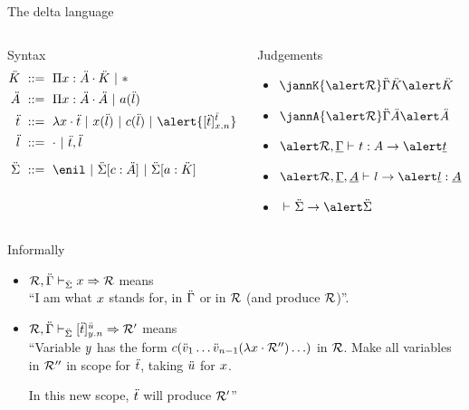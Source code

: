 \documentclass[ignorenonframetext,red]{beamer}
\begin{document}
\begin{frame}{The delta language}
  \inXLF
  \begin{columns}
    \begin{column}{0.6\textwidth}
      \begin{block}{Syntax} \vspace{-2em}
        \begin{align*}
          \mk &\gequal { \prd\mv\mf\mk \gor \type } \\
          \mf &\gequal { \prd\mv\mf\mf \gor \lapp\mcf\ma } \\
          \mo &\gequal { \ulam\mv\mo \gor \lapp\mv\ma \gor \lapp\mco\ma
            \gor \alert{\ibox\mo{\mv.n}\mo}
          } \\
        \ma &\gequal { \lnil \gor \lcons\mo\ma} \\[0.5em]
          \msi &\gequal { \enil \gor \ebinddecl\msi\mco\mf \gor
            \ebinddecl\msi\mcf\mk }
        \end{align*}
      \end{block}
    \end{column}
    \begin{column}{0.4\textwidth}
      \begin{block}{Judgements}
        \begin{itemize}
        \item $\jannK{\alert\mr}\me\mk{\alert\mk}$
        \item $\jannA{\alert\mr}\me\mf{\alert\mf}$
        \item $\jannt{\alert\mr}\me\mo\mf{\alert\mo}$
        \item $\jannl{\alert\mr}\me\mf\ma{\alert\ma}\mf$
        \item $\jannsi\msi{\alert\msi}$
        \end{itemize}
      \end{block}
    \end{column}
  \end{columns}
  \begin{block}{Informally}
    \begin{itemize}
    \item ${{\mathcal{R}},{\ddot{\Gamma}}}\vdash_{\ddot{\Sigma}}{x}\Rightarrow\mathcal{R}$ {\footnotesize
        means}\\ “I am what $x$ stands for, in $\ddot{\Gamma}$ or in $\mathcal{R}$ (and produce $\mathcal{R}$)”.
    \item ${{\mathcal{R}},{\ddot{\Gamma}}}\vdash_{\ddot{\Sigma}}{[\ddot{t}]_{y.n}^{\ddot{u}}}\Rightarrow\mathcal{R'}$
      {\footnotesize means}\\ “Variable $y$ has the form
      ${c}({\ddot{v}_1\ldots\ddot{v}_{n-1}(\lambda{x}\cdot \mathcal{R''})\ldots})$ in $\mathcal{R}$. Make all
      variables in $\mathcal{R''}$ in scope for $\ddot{t}$, taking
      $\ddot{u}$ for $x$.

      In this new scope, $\ddot{t}$ will produce $\mathcal{R'}$”
    \end{itemize}
  \end{block}
\end{frame}
\end{document}
